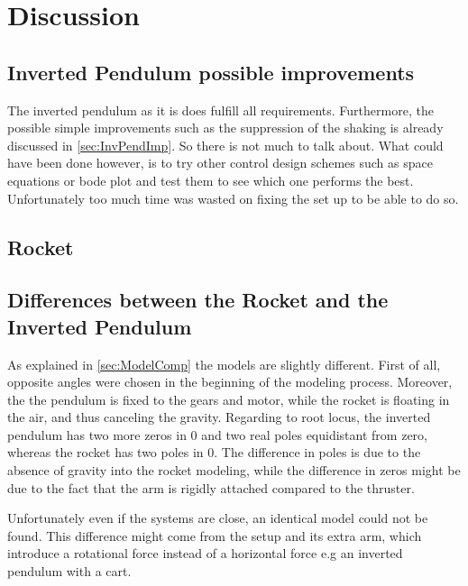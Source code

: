 \chapter{Discussion}\label{sec:Discussion}

\section{Inverted Pendulum possible improvements}

The inverted pendulum as it is does fulfill all requirements. Furthermore, the possible simple improvements such as the suppression of the shaking is already discussed in \autoref{sec:InvPendImp}. So there is not much to talk about. What could have been done however, is to try other control design schemes such as space equations or bode plot and test them to see which one performs the best. Unfortunately too much time was wasted on fixing the set up to be able to do so.

\section{Rocket}



\section{Differences between the Rocket and the Inverted Pendulum}

As explained in \autoref{sec:ModelComp} the models are slightly different. First of all, opposite angles were chosen in the beginning of the modeling process. Moreover, the the pendulum is fixed to the gears and motor, while the rocket is floating in the air, and thus canceling the gravity. Regarding to root locus, the inverted pendulum has two more zeros in 0 and two real poles equidistant from zero, whereas the rocket has two poles in 0. The difference in poles is due to the absence of gravity into the rocket modeling, while the difference in zeros might be due to the fact that the arm is rigidly attached compared to the thruster.

Unfortunately even if the systems are close, an identical model could not be found. This difference might come from the setup and its extra arm, which introduce a rotational force instead of a horizontal force e.g an inverted pendulum with a cart.